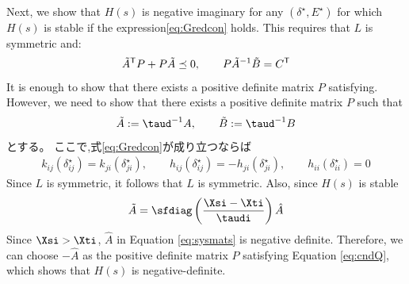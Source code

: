 \documentclass[tombow,dvipdfmx]{corona-a5-1.1}
\begin{document}
\begin{証明}
Next, we show that $H(s)$ is negative imaginary for any $(\delta^{\star},E^{\star})$ for which $H(s)$ is stable if the expression\ref{eq:Gredcon} holds.
This requires that $L$ is symmetric and:
\begin{align}\label{eq:cndQ}
\tilde{A}^{\sf T}P + P\tilde{A} \preceq 0
,\qquad
P\tilde{A}^{-1}\tilde{B}=C^{\sf T}
\end{align}
It is enough to show that there exists a positive definite matrix $P$ satisfying.
However, we need to show that there exists a positive definite matrix $P$ such that
\begin{align*}
\tilde{A}:= \taud^{-1}A
,\qquad
\tilde{B}:= \taud^{-1}B
\end{align*}
とする。
ここで,式\ref{eq:Gredcon}が成り立つならば
\begin{align*}
k_{ij}(\delta_{ij}^{\star}) =
k_{ji}(\delta_{ji}^{\star})
,\qquad
h_{ij}(\delta_{ij}^{\star}) = 
- h_{ji}(\delta_{ji}^{\star}),\qquad
h_{ii}(\delta_{ii}^{\star}) = 0
\end{align*}
Since $L$ is symmetric, it follows that $L$ is symmetric.
Also, since $H(s)$ is stable
\begin{align*}
\tilde{A} = 
\sfdiag \left( \frac{ \Xsi -  \Xti }{ \taudi } \right)
\hat{A}
\end{align*}
Since $\Xsi > \Xti$, $\hat{A}$ in Equation \ref{eq:sysmats} is negative definite.
Therefore, we can choose $-\hat{A}$ as the positive definite matrix $P$ satisfying Equation \ref{eq:cndQ}, which shows that $H(s)$ is negative-definite.



\end{証明}
\end{document}
